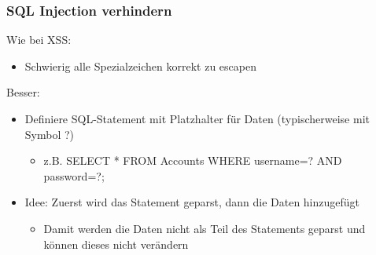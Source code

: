 \subsubsection*{SQL Injection verhindern}
Wie bei XSS: 
\begin{itemize}
    \item Schwierig alle Spezialzeichen korrekt zu escapen
\end{itemize}
Besser: 
\begin{itemize}
    \item Definiere SQL-Statement mit Platzhalter für Daten (typischerweise mit Symbol ?)
    \begin{itemize}
        \item z.B. SELECT * FROM Accounts WHERE username=? AND password=?;
    \end{itemize}
    \item Idee: Zuerst wird das Statement geparst, dann die Daten hinzugefügt
    \begin{itemize}
        \item Damit werden die Daten nicht als Teil des Statements geparst und können dieses nicht verändern
    \end{itemize}
\end{itemize}